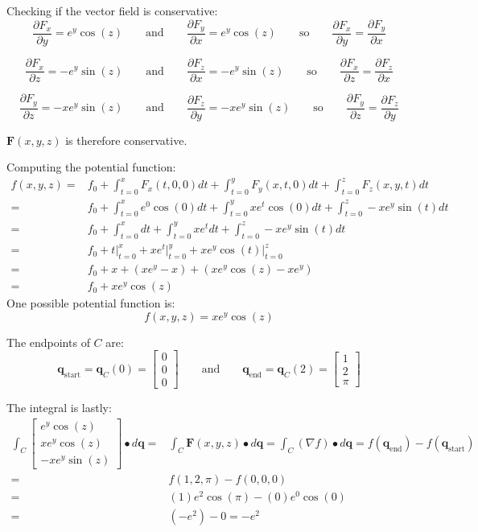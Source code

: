 \documentclass{article}
\begin{document}
\begin{itemize}
Checking if the vector field is conservative:
\[\frac{\partial F_x}{\partial y} = e^y \cos(z) \quad\quad\text{and}\quad\quad \frac{\partial F_y}{\partial x} = e^y \cos(z) \quad\quad\text{so}\quad\quad \frac{\partial F_x}{\partial y} = \frac{\partial F_y}{\partial x}\]

\[\frac{\partial F_x}{\partial z} = -e^y \sin(z) \quad\quad\text{and}\quad\quad \frac{\partial F_z}{\partial x} = -e^y \sin(z) \quad\quad\text{so}\quad\quad \frac{\partial F_x}{\partial z} = \frac{\partial F_z}{\partial x}\]

\[\frac{\partial F_y}{\partial z} = -x e^y \sin(z) \quad\quad\text{and}\quad\quad \frac{\partial F_z}{\partial y} = -x e^y \sin(z) \quad\quad\text{so}\quad\quad \frac{\partial F_y}{\partial z} = \frac{\partial F_z}{\partial y}\]

\(\mathbf{F}(x,y,z)\) is therefore conservative. 

Computing the potential function:
\begin{align*}
f(x,y,z) = & f_0 + \int_{t = 0}^x F_x(t,0,0)dt + \int_{t=0}^y F_y(x,t,0)dt + \int_{t=0}^z F_z(x,y,t)dt \\  
= & f_0 + \int_{t = 0}^x e^0 \cos(0) dt + \int_{t = 0}^y x e^t \cos(0) dt + \int_{t = 0}^z -x e^y \sin(t) dt \\ 
= & f_0 + \int_{t = 0}^x dt + \int_{t = 0}^y x e^t dt + \int_{t = 0}^z -x e^y \sin(t) dt \\
= & f_0 + t\Big|_{t = 0}^x + x e^t\Big|_{t = 0}^y + x e^y \cos(t)\Big|_{t = 0}^z \\
= & f_0 + x + (x e^y - x) + (x e^y \cos(z) - x e^y) \\ 
= & f_0 + x e^y \cos(z)
\end{align*}
One possible potential function is: 
\[f(x,y,z) = x e^y \cos(z)\]

The endpoints of \(C\) are: 
\[\mathbf{q}_{\text{start}} = \mathbf{q}_C(0) = \begin{bmatrix} 0 \\ 0 \\ 0 \end{bmatrix}
\quad\quad\text{and}\quad\quad 
\mathbf{q}_{\text{end}} = \mathbf{q}_C(2) = \begin{bmatrix} 1 \\ 2 \\ \pi \end{bmatrix}\]

The integral is lastly:
\begin{align*}
\int_C \begin{bmatrix}
e^y \cos(z) \\ 
x e^y \cos(z) \\ 
-x e^y \sin(z)
\end{bmatrix} \bullet d\mathbf{q} = & \int_C \mathbf{F}(x,y,z) \bullet d\mathbf{q} 
= \int_C (\nabla f) \bullet d\mathbf{q} 
= f(\mathbf{q}_{\text{end}}) - f(\mathbf{q}_{\text{start}}) \\  
= & f(1, 2, \pi) - f(0, 0, 0) \\ 
= & (1) e^2 \cos(\pi) - (0) e^0 \cos(0) \\ 
= & (- e^2) - 0 
= -e^2 
\end{align*}


\end{itemize}
\end{document}
